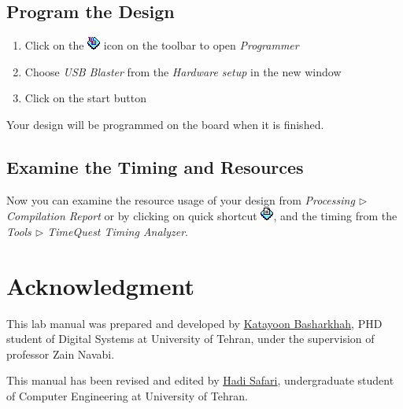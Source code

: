 \documentclass[12pt, logo=tehranDLDL/ut]{tehranDLDL}
\begin{document}
\begin{appendices}
\subsection{Program the Design}

\begin{enumerate}
    \item Click on the \includegraphics[height=2ex]{programmer.png} icon on the toolbar to open \textit{Programmer}
    \item Choose \textit{USB Blaster} from the \textit{Hardware setup} in the new window
    \item Click on the start button
\end{enumerate}

 Your design will be programmed on the board when it is finished.

\subsection{Examine the Timing and Resources}

Now you can examine the resource usage of your design from \textit{Processing $\rhd$ Compilation Report} or by clicking on quick shortcut \includegraphics[height=2ex]{report.png}, and the timing from the \textit{Tools $\rhd$ TimeQuest Timing Analyzer}.

\end{appendices}

\section*{Acknowledgment}

This lab manual was prepared and developed by \href{mailto:ktbasharkhah@gmail.com?subject=[DLDLab]\%20}{Katayoon Basharkhah}, PHD student of Digital Systems at University of Tehran, under the supervision of professor Zain Navabi.

This manual has been revised and edited by \href{mailto:hadi.safari@ut.ac.ir?subject=[DLDLab]\%20}{Hadi Safari}, undergraduate student of Computer Engineering at University of Tehran.
\end{document}
